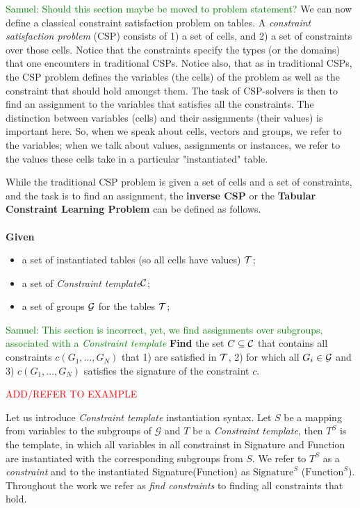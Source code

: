 \documentclass{ecai}
\newcommand{\samuel}[1]{\textcolor{green}{{\sc Samuel:} #1}\xspace}
\newcommand{\format}[1]{\textit{#1}\xspace}
\newcommand{\template}{\format{Constraint template}}
\newcommand{\CSignature}{Signature\xspace}
\newcommand{\CFunction}{Function\xspace}
\newcommand{\groups}{\ensuremath{\mathcal{G}}\xspace}
\newcommand{\luc}[1]{{\textcolor{red}{#1}}}
\begin{document}
\samuel{Should this section maybe be moved to problem statement?}
We can now define a classical constraint satisfaction problem on tables.
A {\em constraint satisfaction problem} (CSP)  consists of 1) a set of cells, and 2) a set of constraints over those cells.
Notice that the constraints specify the types (or the domains) that one encounters in traditional CSPs.
Notice also, that as in traditional CSPs, the CSP problem defines the variables (the cells) of the problem as well as the constraint that should hold amongst them. The task of CSP-solvers is then to find an assignment to the variables that satisfies all the constraints.
The distinction between variables (cells) and their assignments (their values) is important here.
So, when we speak about cells, vectors and groups, we refer to the variables; when we talk about values, assignments or instances, we refer to the values these cells take in a particular "instantiated" table.

While the traditional CSP problem is given a set of cells and a set of constraints,
and the task is to find an assignment, the {\bf inverse CSP} or the {\bf Tabular Constraint Learning Problem} can be defined as follows.\\
\\
{\bf Given }
\begin{itemize}
\item
a set of instantiated tables (so all cells have values) ${\cal T}$;
\item
a set of \template ${\cal C}$;
\item
a set of groups ${\cal G}$ for the tables ${\cal T}$;
\end{itemize}
\noindent
\samuel{This section is incorrect, yet, we find assignments over subgroups, associated with a \template}
{\bf Find}  the set $C\subseteq {\cal C}$ that contains all constraints $c(G_1, ... , G_N)$ that 1) are satisfied  in ${\cal T}$, 2)
for which
all $G_i \in {\cal G}$ and  3)  $c(G_1, ... , G_N)$ satisfies the signature of the constraint $c$.


\luc{ADD/REFER TO EXAMPLE}

Let us introduce \template instantiation syntax. Let $S$ be a mapping from variables to the subgroups of \groups and $T$ be a \template, then $T^S$ is the template, in which all variables in all constrainst in \CSignature and \CFunction are instantiated with the corresponding subgroups from $S$. We refer to $T^S$ as a \textit{constraint} and to the instantiated \CSignature (\CFunction) as $\text{\CSignature}^S$ ($\text{\CFunction}^S$). Throughout the work we refer as \textit{find constraints} to finding all constraints that hold.
\end{document}
